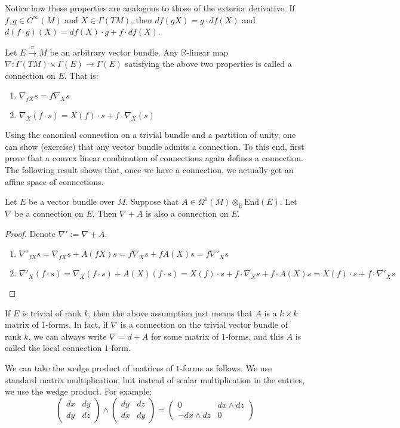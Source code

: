 Notice how these properties are analogous to those of the exterior derivative. If $f,g\in C^\infty(M)$ and $X\in\Gamma(TM)$, then $df(gX)=g\cdot df(X)$ and $d(f\cdot g)(X)=df(X)\cdot g+f\cdot df(X)$.
\begin{definition}
  Let $E\xrightarrow{\pi}M$ be an arbitrary vector bundle. Any $\mathbb{R}$-linear map $\nabla:\Gamma(TM)\times\Gamma(E)\to\Gamma(E)$ satisfying the above two properties is called a connection on $E$. That is:
  \begin{enumerate}
    \item $\nabla_{fX}s=f\nabla_Xs$
    \item $\nabla_X(f\cdot s)=X(f)\cdot s+f\cdot\nabla_X(s)$
  \end{enumerate}
\end{definition}
Using the canonical connection on a trivial bundle and a partition of unity, one can show (exercise) that any vector bundle admits a connection. To this end, first prove that a convex linear combination of connections again defines a connection. The following result shows that, once we have a connection, we actually get an affine space of connections.
\begin{proposition}
  Let $E$ be a vector bundle over $M$. Suppose that $A\in\Omega^1(M)\otimes_\mathbb{R}\text{End}(E)$. Let $\nabla$ be a connection on $E$. Then $\nabla + A$ is also a connection on $E$. 
\end{proposition}
\begin{proof}
  Denote $\nabla':=\nabla+A$.
  \begin{enumerate}
    \item $\nabla'_{fX}s=\nabla_{fX}s+A(fX)s=f\nabla_Xs+fA(X)s=f\nabla'_Xs$
    \item $\nabla'_X(f\cdot s)=\nabla_X(f\cdot s)+A(X)(f\cdot s)=X(f)\cdot s+f\cdot\nabla_Xs+f\cdot A(X)s=X(f)\cdot s+f\cdot\nabla'_Xs$
  \end{enumerate}
\end{proof}
If $E$ is trivial of rank $k$, then the above assumption just means that $A$ is a $k\times k$ matrix of $1$-forms. In fact, if $\nabla$ is a connection on the trivial vector bundle of rank $k$, we can always write $\nabla=d+A$ for some matrix of $1$-forms, and this $A$ is called the local connection $1$-form. 
\begin{remark}
  We can take the wedge product of matrices of $1$-forms as follows. We use standard matrix multiplication, but instead of scalar multiplication in the entries, we use the wedge product. For example:
  $$\begin{pmatrix}dx & dy\\ dy & dz\end{pmatrix}\wedge\begin{pmatrix}dy & dz\\ dx & dy\end{pmatrix}=\begin{pmatrix}0 & dx\wedge dz\\ -dx\wedge dz & 0\end{pmatrix}$$
\end{remark}
